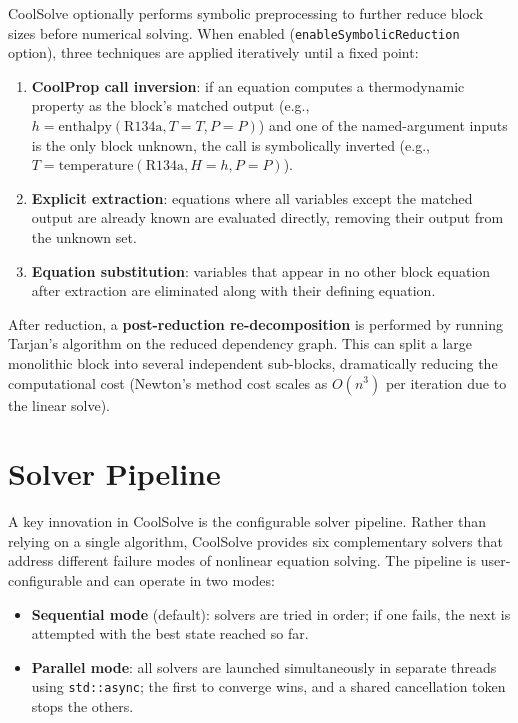 \documentclass[review,3p]{elsarticle}
\begin{document}
CoolSolve optionally performs symbolic preprocessing to further reduce block sizes before numerical solving. When enabled (\texttt{enableSymbolicReduction} option), three techniques are applied iteratively until a fixed point:
\begin{enumerate}
    \item \textbf{CoolProp call inversion}: if an equation computes a thermodynamic property as the block's matched output (e.g., $h = \text{enthalpy}(\text{R134a}, T{=}T, P{=}P)$) and one of the named-argument inputs is the only block unknown, the call is symbolically inverted (e.g., $T = \text{temperature}(\text{R134a}, H{=}h, P{=}P)$).
    \item \textbf{Explicit extraction}: equations where all variables except the matched output are already known are evaluated directly, removing their output from the unknown set.
    \item \textbf{Equation substitution}: variables that appear in no other block equation after extraction are eliminated along with their defining equation.
\end{enumerate}

After reduction, a \textbf{post-reduction re-decomposition} is performed by running Tarjan's algorithm on the reduced dependency graph. This can split a large monolithic block into several independent sub-blocks, dramatically reducing the computational cost (Newton's method cost scales as $O(n^3)$ per iteration due to the linear solve).

\section{Solver Pipeline}
\label{sec:solvers}

A key innovation in CoolSolve is the configurable solver pipeline. Rather than relying on a single algorithm, CoolSolve provides six complementary solvers that address different failure modes of nonlinear equation solving. The pipeline is user-configurable and can operate in two modes:
\begin{itemize}
    \item \textbf{Sequential mode} (default): solvers are tried in order; if one fails, the next is attempted with the best state reached so far.
    \item \textbf{Parallel mode}: all solvers are launched simultaneously in separate threads using \texttt{std::async}; the first to converge wins, and a shared cancellation token stops the others.
\end{itemize}
\end{document}
